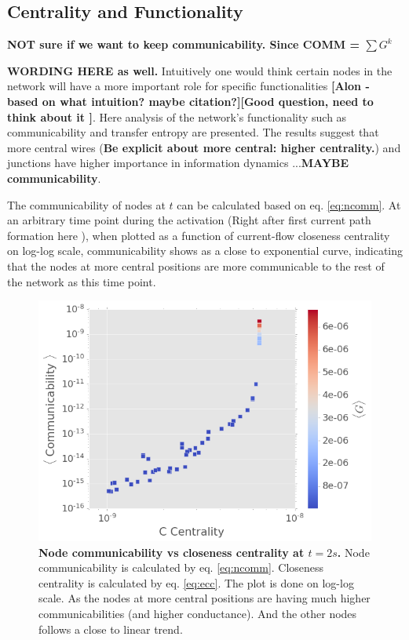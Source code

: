 \documentclass[fleqn,10pt,  amsmath,amssymb,aps]{wlscirep}
\begin{document}
\subsection*{Centrality and Functionality}

\textbf{NOT sure if we want to keep communicability. Since COMM = $\sum G^k$}

\textbf{WORDING HERE as well.} Intuitively one would think certain nodes in the network will have a more important role for specific functionalities \textbf{[Alon - based on what intuition? maybe citation?][Good question, need to think about it ]}. Here analysis of the network's functionality such as communicability and transfer entropy are presented. The results suggest that more central wires (\textbf{Be explicit about more central: higher centrality.}) and junctions have higher importance in information dynamics ...\textbf{MAYBE communicability}.  

The communicability of nodes at $t$ can be calculated based on eq. \ref{eq:ncomm}. At an arbitrary time point during the activation (Right after first current path formation here ), when plotted as a function of current-flow closeness centrality on log-log scale, communicability shows as a close to exponential curve, indicating that the nodes at more central positions are more communicable to the rest of the network as this time point. 

\begin{figure}[h]
	\centering
	\includegraphics[width=0.5\linewidth]{figure/comm_cent}
	\caption{\textbf{Node communicability vs closeness centrality at $t = 2 s$.} Node communicability is calculated by eq. \ref{eq:ncomm}. Closeness centrality is calculated by eq. \ref{eq:ecc}. The plot is done on log-log scale. As the nodes at more central positions are having much higher communicabilities (and higher conductance). And the other nodes follows a close to linear trend.}
	\label{fig:comm_cent}
\end{figure}
\end{document}
